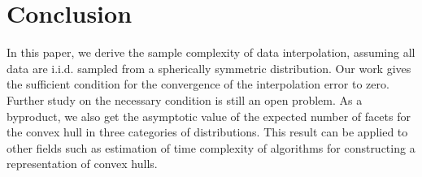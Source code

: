 \documentclass[conference,a4paper]{IEEEtran}
\begin{document}
\section{Conclusion}
\label{sec:conclusion}
In this paper, we derive the sample complexity of data interpolation,
assuming all data are i.i.d. sampled from a spherically symmetric distribution.
Our work gives the sufficient
condition for the convergence of the interpolation error to zero.
Further study on the necessary condition is still an open problem.
As a byproduct, we also get the asymptotic value of the expected
number of facets for the convex hull in three categories of distributions.
This result can be applied
to other fields such as estimation of time complexity of algorithms
for constructing a representation of convex hulls.




%



\appendix
\end{document}
